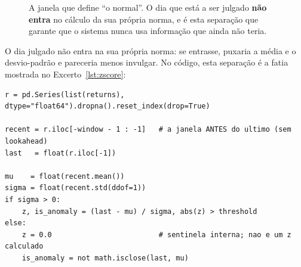 \begin{figure}[ht]
\centering
{}
\caption[A janela deslizante do \emph{z}-score]{A janela que define ``o normal''. O dia que está a ser
julgado \textbf{não entra} no cálculo da sua própria norma, e é esta separação que garante que o
sistema nunca usa informação que ainda não teria.}
\label{fig:janela}
\end{figure}

O dia julgado não entra na sua própria norma: se entrasse, puxaria a média e o desvio-padrão e
pareceria menos invulgar. No código, esta separação é a fatia mostrada no
Excerto~\ref{lst:zscore}:

\begin{lstlisting}[label=lst:zscore, caption={O cálculo do \emph{z}-score. A fatia \texttt{[-window-1:-1]} exclui o
próprio dia da janela que define a sua norma.}]
r = pd.Series(list(returns), dtype="float64").dropna().reset_index(drop=True)

recent = r.iloc[-window - 1 : -1]   # a janela ANTES do ultimo (sem lookahead)
last   = float(r.iloc[-1])

mu    = float(recent.mean())
sigma = float(recent.std(ddof=1))
if sigma > 0:
    z, is_anomaly = (last - mu) / sigma, abs(z) > threshold
else:
    z = 0.0                         # sentinela interna; nao e um z calculado
    is_anomaly = not math.isclose(last, mu)
\end{lstlisting}

